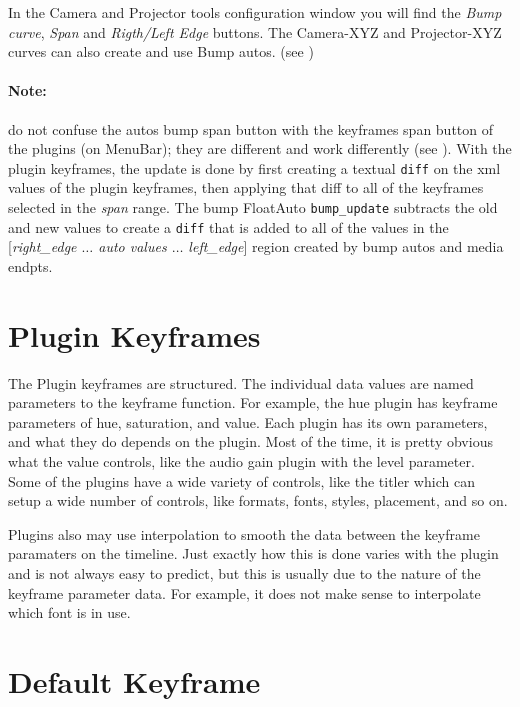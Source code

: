 In the Camera and Projector tools configuration window you will find the \textit{Bump curve}, \textit{Span} and \textit{Rigth/Left Edge} buttons. The Camera-XYZ and Projector-XYZ curves can also create and use Bump autos. (see )

\paragraph{Note:} do not confuse the autos bump span button with the keyframes span button of the plugins (on MenuBar); they are different and work differently (see ). With the plugin keyframes, the update is done by first creating a textual \texttt{diff} on the xml values of the plugin keyframes, then applying that diff to all of the keyframes selected in the \textit{span} range.  The bump FloatAuto \texttt{bump\_update} subtracts the old and new values to create a \texttt{diff} that is added to all of the values in the [\textit{right\_edge $\dots$ auto values $\dots$ left\_edge}] region created by bump autos and media endpts.

\section{Plugin Keyframes}%
\label{sec:plugin_keyframe}

The Plugin keyframes are structured.  The individual data values are named parameters to the keyframe function.  For example, the hue plugin has keyframe parameters of hue, saturation, and value.  Each plugin has its own parameters, and what they do depends on the plugin.  Most of the time, it is pretty obvious what the value controls, like the audio gain plugin with the level parameter.  Some of the plugins have a wide variety of controls, like the titler which can setup a wide number of controls, like formats, fonts, styles, placement, and so on.

Plugins also may use interpolation to smooth the data between the keyframe paramaters on the timeline.  Just exactly how this is done varies with the plugin and is not always easy to predict, but this
is usually due to the nature of the keyframe parameter data.  For example, it does not make sense to interpolate which font is in use.

\section{Default Keyframe}%
\label{sec:default_keyframe}

